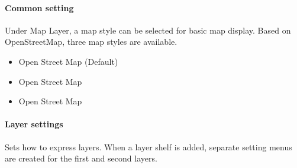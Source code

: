 \documentclass[letterpaper,10pt,english]{sphinxmanual}
\begin{document}
\paragraph{Common setting}
\label{\detokenize{discovery/part04/map_chart:id6}}
Under Map Layer, a map style can be selected for basic map display. Based on OpenStreetMap, three map styles are available.
\begin{quote}

\begin{figure}[H]
\centering

\noindent{}
\end{figure}
\end{quote}
\begin{itemize}
\item {} 
Open Street Map  (Default)

\item {} 
Open Street Map 

\item {} 
Open Street Map 

\end{itemize}


\paragraph{Layer settings}
\label{\detokenize{discovery/part04/map_chart:id7}}
Sets how to express layers. When a layer shelf is added, separate setting menus are created for the first and second layers.
\end{document}
